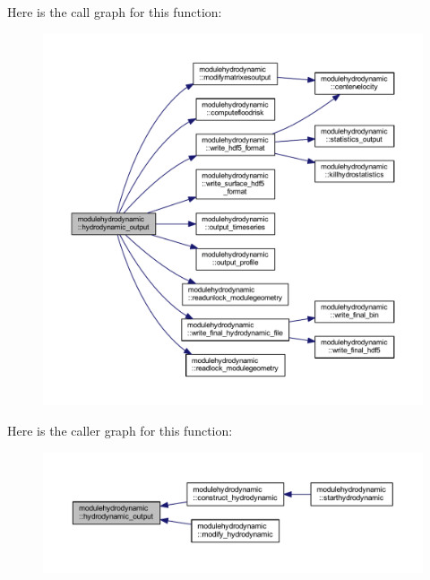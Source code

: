 Here is the call graph for this function\+:\nopagebreak
\begin{figure}[H]
\begin{center}
\leavevmode
\includegraphics[width=350pt]{namespacemodulehydrodynamic_a60b8585327586b632ce2934f2676df87_cgraph}
\end{center}
\end{figure}
Here is the caller graph for this function\+:\nopagebreak
\begin{figure}[H]
\begin{center}
\leavevmode
\includegraphics[width=350pt]{namespacemodulehydrodynamic_a60b8585327586b632ce2934f2676df87_icgraph}
\end{center}
\end{figure}
\mbox{\label{namespacemodulehydrodynamic_a310b0813e62bd6d4cb63d9e4acbf299d}} 
